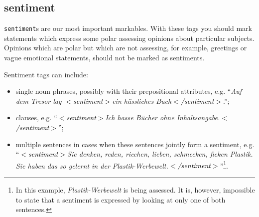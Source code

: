 \documentclass[11pt,a4paper]{article}
\newcommand{\xmltag}[1]{\textcolor{black}{{\small$<$#1$>$}}}
\begin{document}
\subsection{sentiment}
\texttt{sentiment}s are our most important markables.  With these tags
you should mark statements which express some polar assessing opinions
about particular subjects.  Opinions which are polar but which are not
assessing, for example, greetings or vague emotional statements,
should not be marked as sentiments.

Sentiment tags can include:
\begin{itemize}
\item single noun phrases, possibly with their prepositional
  attributes, e.g. ``\textit{Auf dem Tresor lag \xmltag{sentiment}ein
    h\"assliches Buch\xmltag{/sentiment}}.'';
\item clauses, e.g. ``\textit{\xmltag{sentiment}Ich hasse B\"ucher
  ohne Inhaltsangabe.\xmltag{/sentiment}}'';
\item multiple sentences in cases when these sentences jointly form a
  sentiment, e.g. ``\textit{\xmltag{sentiment}Sie denken, reden,
    riechen, lieben, schmecken, ficken Plastik. Sie haben das so
    gelernt in der
    Plastik-Werbewelt.\xmltag{/sentiment}}''\footnote{In this example,
    \textit{Plastik-Werbewelt} is being assessed.  It is, however,
    impossible to state that a sentiment is expressed by looking at
    only one of both sentences.}.
\end{itemize}
\end{document}
